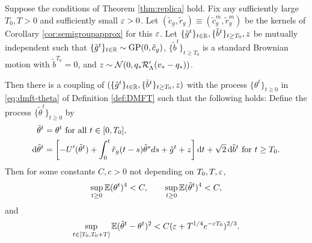 \begin{lemma}\label{lemma:thetacoupling}
Suppose the conditions of Theorem \ref{thm:replica} hold.
Fix any sufficiently large $T_0,T>0$ and sufficiently small $\varepsilon>0$.
Let $(\tilde c_g,\tilde r_g) \equiv (\tilde c_g^m,\tilde r_g^m)$ be
the kernels of Corollary \ref{cor:semigroupapprox} for this $\varepsilon$. Let
$\{\tilde g^t\}_{t \in \mathbb{R}},\{\tilde b^t\}_{t \geq T_0},z$
be mutually independent such that
$\{\tilde g^t\}_{t \in \mathbb{R}} \sim \operatorname{GP}(0,\tilde c_g)$,
$\{\tilde b^t\}_{t \geq T_0}$ is a standard Brownian motion with $\tilde b^{T_0}=0$, and $z \sim \mathcal{N}(0,q_*\mathcal{R}_\Lambda'(v_*-q_*))$.

Then there is a coupling of
$(\{\tilde g^t\}_{t \in \mathbb{R}},\{\tilde b^t\}_{t \geq T_0},z)$
with the process $\{\theta^t\}_{t \geq 0}$ in \eqref{eq:dmft-theta} of
Definition \ref{def:DMFT} such that the following holds: Define the process
$\{\tilde \theta^t\}_{t \geq 0}$ by
\begin{align*}
\tilde\theta^t&=\theta^t \text{ for all } t \in [0,T_0],\\
\mathrm{d}\tilde \theta^t&=
\left[-U'(\tilde \theta^t)+\int_0^t \tilde r_g(t-s)
\tilde \theta^s ds+\tilde g^t+z\right]
\mathrm{d} t+\sqrt{2}\,\mathrm{d} \tilde b^t \text{ for } t \geq T_0.
\end{align*}
Then for some constants $C,c>0$ not depending on $T_0,T,\varepsilon$,
\begin{equation}\label{eq:thetafourthmoment}
\sup_{t \geq 0} \mathbb{E}(\theta^t)^4<C,
\qquad \sup_{t \geq 0} \mathbb{E}(\tilde \theta^t)^4<C,
\end{equation}
and
\begin{equation}\label{eq:thetacoupling}
\sup_{t \in [T_0,T_0+T]} \mathbb{E}(\tilde \theta^t-\theta^t)^2
<C(\varepsilon+T^{1/4}e^{-cT_0})^{2/3}.
\end{equation}
\end{lemma}
